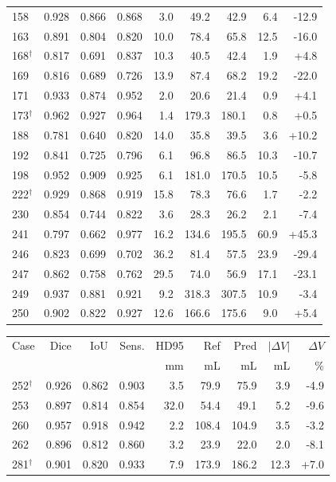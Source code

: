 {\begin{tabular}{@{}lrrrrrrrr@{}}
158 & 0.928 & 0.866 & 0.868 & 3.0 & 49.2 & 42.9 & 6.4 & -12.9 \\
163 & 0.891 & 0.804 & 0.820 & 10.0 & 78.4 & 65.8 & 12.5 & -16.0 \\
168$^\dagger$ & 0.817 & 0.691 & 0.837 & 10.3 & 40.5 & 42.4 & 1.9 & +4.8 \\
169 & 0.816 & 0.689 & 0.726 & 13.9 & 87.4 & 68.2 & 19.2 & -22.0 \\
171 & 0.933 & 0.874 & 0.952 & 2.0 & 20.6 & 21.4 & 0.9 & +4.1 \\
173$^\dagger$ & 0.962 & 0.927 & 0.964 & 1.4 & 179.3 & 180.1 & 0.8 & +0.5 \\
188 & 0.781 & 0.640 & 0.820 & 14.0 & 35.8 & 39.5 & 3.6 & +10.2 \\
192 & 0.841 & 0.725 & 0.796 & 6.1 & 96.8 & 86.5 & 10.3 & -10.7 \\
198 & 0.952 & 0.909 & 0.925 & 6.1 & 181.0 & 170.5 & 10.5 & -5.8 \\
222$^\dagger$ & 0.929 & 0.868 & 0.919 & 15.8 & 78.3 & 76.6 & 1.7 & -2.2 \\
230 & 0.854 & 0.744 & 0.822 & 3.6 & 28.3 & 26.2 & 2.1 & -7.4 \\
241 & 0.797 & 0.662 & 0.977 & 16.2 & 134.6 & 195.5 & 60.9 & +45.3 \\
246 & 0.823 & 0.699 & 0.702 & 36.2 & 81.4 & 57.5 & 23.9 & -29.4 \\
247 & 0.862 & 0.758 & 0.762 & 29.5 & 74.0 & 56.9 & 17.1 & -23.1 \\
249 & 0.937 & 0.881 & 0.921 & 9.2 & 318.3 & 307.5 & 10.9 & -3.4 \\
250 & 0.902 & 0.822 & 0.927 & 12.6 & 166.6 & 175.6 & 9.0 & +5.4 \\
\bottomrule
\end{tabular}
\hfill
\begin{tabular}{@{}lrrrrrrrr@{}}\toprule
Case & Dice & IoU & Sens. & HD95 & Ref & Pred & $|\Delta V|$ & $\Delta V$ \\
 & & & & mm & mL & mL & mL & \% \\\midrule
252$^\dagger$ & 0.926 & 0.862 & 0.903 & 3.5 & 79.9 & 75.9 & 3.9 & -4.9 \\
253 & 0.897 & 0.814 & 0.854 & 32.0 & 54.4 & 49.1 & 5.2 & -9.6 \\
260 & 0.957 & 0.918 & 0.942 & 2.2 & 108.4 & 104.9 & 3.5 & -3.2 \\
262 & 0.896 & 0.812 & 0.860 & 3.2 & 23.9 & 22.0 & 2.0 & -8.1 \\
281$^\dagger$ & 0.901 & 0.820 & 0.933 & 7.9 & 173.9 & 186.2 & 12.3 & +7.0 \\

\end{tabular}}
